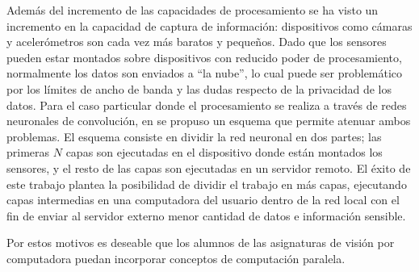 Además del incremento de las capacidades de procesamiento se ha visto un
incremento en la capacidad de captura de información: dispositivos como cámaras
y acelerómetros son cada vez más baratos y pequeños. Dado que los sensores
pueden estar montados sobre dispositivos con reducido poder de procesamiento,
normalmente los datos son enviados a ``la nube'', lo cual puede ser problemático
por los límites de ancho de banda y las dudas respecto de la privacidad de los
datos.
Para el caso particular donde el procesamiento se realiza a través de redes
neuronales de convolución, en \cite{pipelinebasedCaffe2017} se propuso un
esquema que permite atenuar ambos problemas. El esquema consiste en dividir la
red neuronal en dos partes; las primeras $N$ capas son ejecutadas en el
dispositivo donde están montados los sensores, y el resto de las capas son
ejecutadas en un servidor remoto. El éxito de este trabajo plantea la
posibilidad de dividir el trabajo en más capas, ejecutando capas intermedias en
una computadora del usuario dentro de la red local con el fin de enviar al
servidor externo menor cantidad de datos e información sensible.

Por estos motivos es deseable que los alumnos de las asignaturas de visión por
computadora puedan incorporar conceptos de computación paralela.
